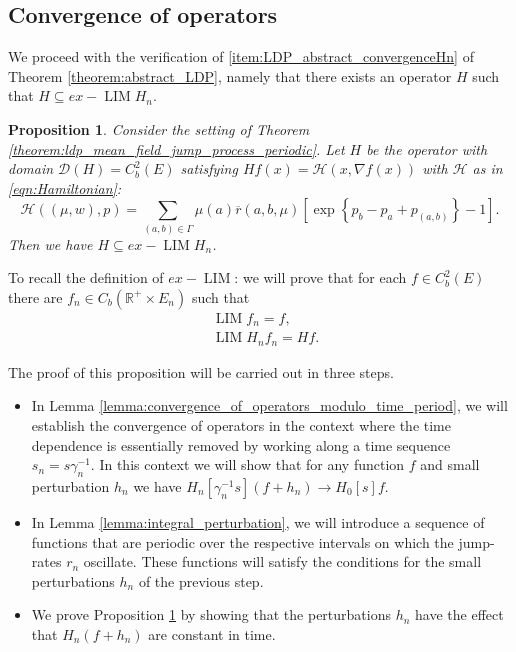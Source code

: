 \documentclass[a4paper]{article}
\newcommand{\cD}{\mathcal{D}}
\newcommand{\cH}{\mathcal{H}}
\newcommand{\bR}{\mathbb{R}}
\DeclareMathOperator*{\LIM}{LIM}
\numberwithin{equation}{section}
\newtheorem{proposition}[theorem]{Proposition}
\theoremstyle{definition}
\begin{document}
\subsection{Convergence of operators} \label{section:convergence_of_operators}

We proceed with the verification of \ref{item:LDP_abstract_convergenceHn} of Theorem \ref{theorem:abstract_LDP}, namely that there exists an operator $H$ such that $H \subseteq ex-\LIM H_n$. 


\begin{proposition} \label{proposition:convergence_of_operators}
	Consider the setting of Theorem \ref{theorem:ldp_mean_field_jump_process_periodic}.	Let  $H$ be the operator with domain $\cD(H) = C_b^2(E)$ satisfying $Hf(x) = \cH(x,\nabla f(x))$ with $\cH$ as in \eqref{eqn:Hamiltonian}:
	\begin{equation} \label{eqn:Hamiltonian_proof}
		\cH((\mu,w),p) = \sum_{(a,b) \in \Gamma} \mu(a) \overline{r}(a,b,\mu)\left[\exp\left\{p_b - p _a + p_{(a,b)} \right\} - 1 \right].
	\end{equation}
	Then we have $H \subseteq ex-\LIM H_n$.
\end{proposition}


To recall the definition of $ex-\LIM$: we will prove that for each $f \in C_b^2(E)$ there are $f_n \in C_b(\bR^+ \times E_n)$ such that 
\begin{align}
	& \LIM f_n = f, \label{eqn:convergence_functions_time_periodic} \\
	& \LIM H_n f_n = Hf. \label{eqn:convergence_Hfunctions_time_periodic}
\end{align}

The proof of this proposition will be carried out in three steps. 
\begin{itemize}
	\item In Lemma \ref{lemma:convergence_of_operators_modulo_time_period}, we will establish the convergence of operators in the context where the time dependence is essentially removed by working along a time sequence $s_n = s\gamma_n^{-1}$. In this context we will show that for any function $f$ and small perturbation $h_n$ we have $H_n[\gamma_n^{-1} s] (f + h_n) \rightarrow H_0[s]f$.
	\item In Lemma \ref{lemma:integral_perturbation}, we will introduce a sequence of functions that are periodic over the respective intervals on which the jump-rates $r_n$ oscillate. These functions will satisfy the conditions for the small perturbations $h_n$ of the previous step. 
	\item We prove Proposition \ref{proposition:convergence_of_operators} by showing that the perturbations $h_n$ have the effect that $H_n(f + h_n)$ are constant in time. 
\end{itemize}
\end{document}
